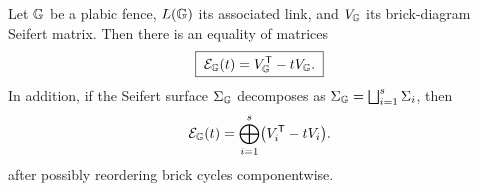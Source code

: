 \begin{proposition}\label{prop:fence-seifert}
Let $\mathbb G$ be a plabic fence, $L(\mathbb G)$ its associated link, and $V_\mathbb G$ its brick-diagram Seifert matrix. Then there is an equality of matrices
\begin{equation}\label{eq:E-V}
   \boxed{\;\mathcal E_{\mathbb G}(t)=V_\mathbb G^{\mathsf T}-tV_\mathbb G.\;}
\end{equation}
In addition, if the Seifert surface $\Sigma_\mathbb G$ decomposes as $\Sigma_\mathbb G=\bigsqcup_{i=1}^s\Sigma_i$, then 
\begin{equation}\label{eq:E-block}
   \mathcal E_{\mathbb G}(t)=\bigoplus_{i=1}^s
   \bigl(V_i^{\mathsf T}-tV_i\bigr).
\end{equation}
after possibly reordering brick cycles componentwise.
\end{proposition}

